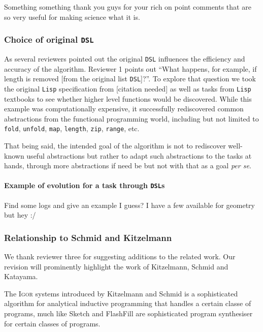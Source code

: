 \documentclass{article}
\begin{document}
Something something thank you guys for your rich on point comments that are so
very useful for making science what it is.

\subsubsection*{Choice of original \texttt{DSL}}

As several reviewers pointed out the original \texttt{DSL} influences the efficiency and
accuracy of the algorithm. Reviewer 1 points out ``What happens, for example, if
length is removed [from the original list \texttt{DSL}]?''. To explore that question we
took the original \texttt{Lisp} specification from [citation needed] as well as
tasks from \texttt{Lisp} textbooks to see whether higher level functions would
be discovered. While this example was computationally expensive, it successfully
rediscovered common abstractions from the functional programming world,
including but not limited to \texttt{fold}, \texttt{unfold}, \texttt{map},
\texttt{length}, \texttt{zip}, \texttt{range}, etc.

That being said, the intended goal of the algorithm is not to rediscover
well-known useful abstractions but rather to adapt such abstractions to the
tasks at hands, through more abstractions if need be but not with that as a goal
\textit{per se}.

\paragraph*{Example of evolution for a task through \texttt{DSL}s}

Find some logs and give an example I guess? I have a few available for geometry
but hey :/

\subsubsection*{Relationship to Schmid and Kitzelmann}

We thank reviewer three for suggesting additions to the related work. Our
revision will prominently highlight the work of Kitzelmann, Schmid and Katayama.

The \textsc{Igor} systems introduced by Kitzelmann and Schmid is a sophisticated
algorithm for analytical inductive programming that handles a certain classe of
programs, much like {Sketch} and {FlashFill} are sophisticated
program synthesiser for certain classes of programs.
\end{document}
